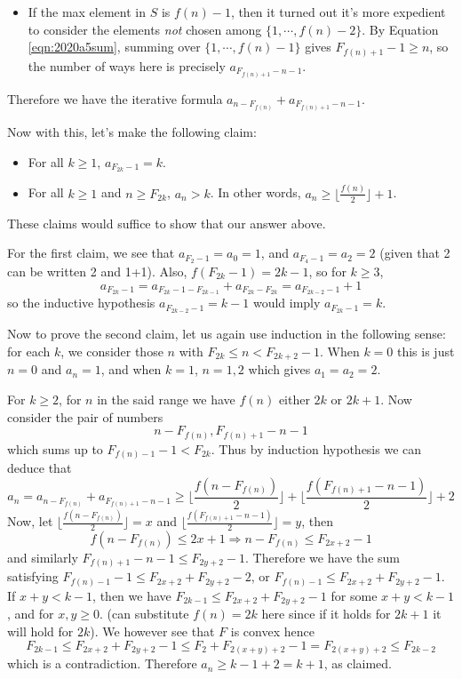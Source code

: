 \documentclass[11pt,a4paper]{article}
\newcommand{\<}{\langle}
\renewcommand{\>}{\rangle}
\begin{document}
\begin{enumerate}
\begin{itemize}
		\item If the max element in $S$ is $f(n)-1$, then it turned out it's more expedient to consider the elements \emph{not} chosen among $\{1, \cdots, f(n)-2\}$. 
		By Equation \ref{eqn:2020a5sum}, 
		summing over $\{1, \cdots, f(n)-1\}$ gives $F_{f(n)+1}-1\ge n$, 
		so the number of ways here is precisely $a_{F_{f(n)+1}-n-1}$. 
		
	\end{itemize}
    Therefore we have the iterative formula $a_{n-F_{f(n)}}+a_{F_{f(n)+1}-n-1}$. 
    
    Now with this, let's make the following claim: 
    \begin{itemize}
    	\item For all $k\ge 1$, $a_{F_{2k}-1}=k$. 
    	
    	\item For all $k\ge 1$ and $n\ge F_{2k}$, $a_n>k$. In other words, $a_{n}\ge \lfloor \frac{f(n)}{2}\rfloor+1$. 
    \end{itemize}
    These claims would suffice to show that our answer above. 
    
    For the first claim, we see that $a_{F_2-1}=a_0=1$, and $a_{F_4-1}=a_2=2$ (given that 2 can be written 2 and 1+1). 
    Also, $f(F_{2k}-1)=2k-1$, 
    so for $k\ge 3$, 
    \[a_{F_{2k}-1}=a_{F_{2k}-1-F_{2k-1}}+a_{F_{2k}-F_{2k}}=a_{F_{2k-2}-1}+1
    \]
    so the inductive hypothesis $a_{F_{2k-2}-1}=k-1$ would imply $a_{F_{2k}-1}=k$. 
    
    Now to prove the second claim, let us again use induction in the following sense: 
    for each $k$, we consider those $n$ with $F_{2k}\le n < F_{2k+2}-1$. 
    When $k=0$ this is just $n=0$ and $a_n=1$, and when $k=1$, $n=1, 2$ which gives $a_1=a_2=2$. 
    
    For $k\ge 2$, for $n$ in the said range we have $f(n)$ either $2k$ or $2k+1$. 
    Now consider the pair of numbers 
    \[
    n-F_{f(n)}, F_{f(n)+1}-n-1
    \]
    which sums up to $F_{f(n)-1}-1< F_{2k}$. Thus by induction hypothesis we can deduce that 
    \[a_n=a_{n-F_{f(n)}}+a_{F_{f(n)+1}-n-1}\ge 
    \lfloor\frac{f(n-F_{f(n)})}{2}\rfloor + \lfloor\frac{f(F_{f(n)+1}-n-1)}{2}\rfloor + 2
    \]
    Now, let $\lfloor\frac{f(n-F_{f(n)})}{2}\rfloor=x$ and $\lfloor\frac{f(F_{f(n)+1}-n-1)}{2}\rfloor =y$, 
    then 
    \[
    f(n-F_{f(n)})\le 2x+1 \Rightarrow n-F_{f(n)}\le F_{2x+2}-1
    \]
    and similarly $F_{f(n)+1}-n-1\le F_{2y+2}-1$. 
    Therefore we have the sum satisfying
    $F_{f(n)-1}-1\le F_{2x+2}+F_{2y+2}-2$, or $F_{f(n)-1}\le F_{2x+2}+F_{2y+2}-1$. 
    If $x+y<k-1$, then we have $F_{2k-1}\le F_{2x+2}+F_{2y+2}-1$ for some $x+y<k-1$, and for $x, y\ge 0$. 
    (can substitute $f(n)=2k$ here since if it holds for $2k+1$ it will hold for $2k$). 
    We however see that $F$ is convex hence 
    \[F_{2k-1}\le F_{2x+2}+F_{2y+2}-1\le F_2 + F_{2(x+y)+2}-1 = F_{2(x+y)+2}\le F_{2k-2}
    \]
    which is a contradiction. 
    Therefore $a_n\ge k-1+2=k+1$, as claimed. 
	

\end{enumerate}
\end{document}
